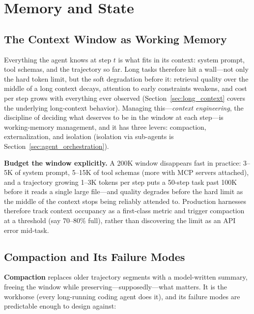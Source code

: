 \section{Memory and State}
\label{sec:agent_memory}

\subsection{The Context Window as Working Memory}

Everything the agent knows at step $t$ is what fits in its context: system prompt, tool schemas, and the trajectory so far. Long tasks therefore hit a wall---not only the hard token limit, but the soft degradation before it: retrieval quality over the middle of a long context decays, attention to early constraints weakens, and cost per step grows with everything ever observed (Section~\ref{sec:long_context} covers the underlying long-context behavior). Managing this---\textit{context engineering}, the discipline of deciding what deserves to be in the window at each step---is working-memory management, and it has three levers: compaction, externalization, and isolation (isolation via sub-agents is Section~\ref{sec:agent_orchestration}).

\textbf{Budget the window explicitly.} A 200K window disappears fast in practice: 3--5K of system prompt, 5--15K of tool schemas (more with MCP servers attached), and a trajectory growing 1--3K tokens per step puts a 50-step task past 100K before it reads a single large file---and quality degrades before the hard limit as the middle of the context stops being reliably attended to. Production harnesses therefore track context occupancy as a first-class metric and trigger compaction at a threshold (say 70--80\% full), rather than discovering the limit as an API error mid-task.

\subsection{Compaction and Its Failure Modes}

\textbf{Compaction} replaces older trajectory segments with a model-written summary, freeing the window while preserving---supposedly---what matters. It is the workhorse (every long-running coding agent does it), and its failure modes are predictable enough to design against:

